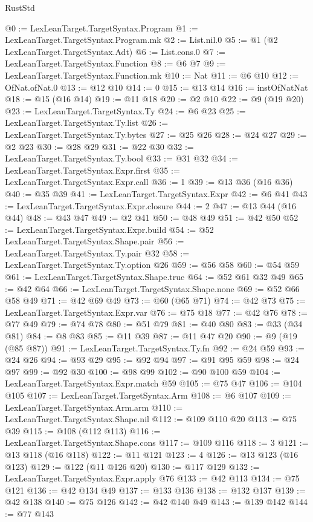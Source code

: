 \begin{lexlean}{RustStd}
\begin{coremodule}
{\begin{coremodule}
{{{{{{{{{@0 := LexLeanTarget.TargetSyntax.Program
@1 := LexLeanTarget.TargetSyntax.Program.mk
@2 := List.nil.{0}
@5 := @1 (@2 LexLeanTarget.TargetSyntax.Adt)
@6 := List.cons.{0}
@7 := LexLeanTarget.TargetSyntax.Function
@8 := @6 @7
@9 := LexLeanTarget.TargetSyntax.Function.mk
@10 := Nat
@11 := @6 @10
@12 := OfNat.ofNat.{0}
@13 := @12 @10
@14 := 0
@15 := @13 @14
@16 := instOfNatNat
@18 := @15 (@16 @14)
@19 := @11 @18
@20 := @2 @10
@22 := @9 (@19 @20)
@23 := LexLeanTarget.TargetSyntax.Ty
@24 := @6 @23
@25 := LexLeanTarget.TargetSyntax.Ty.list
@26 := LexLeanTarget.TargetSyntax.Ty.bytes
@27 := @25 @26
@28 := @24 @27
@29 := @2 @23
@30 := @28 @29
@31 := @22 @30
@32 := LexLeanTarget.TargetSyntax.Ty.bool
@33 := @31 @32
@34 := LexLeanTarget.TargetSyntax.Expr.first
@35 := LexLeanTarget.TargetSyntax.Expr.call
@36 := 1
@39 := @13 @36 (@16 @36)
@40 := @35 @39
@41 := LexLeanTarget.TargetSyntax.Expr
@42 := @6 @41
@43 := LexLeanTarget.TargetSyntax.Expr.closure
@44 := 2
@47 := @13 @44 (@16 @44)
@48 := @43 @47
@49 := @2 @41
@50 := @48 @49
@51 := @42 @50
@52 := LexLeanTarget.TargetSyntax.Expr.build
@54 := @52 LexLeanTarget.TargetSyntax.Shape.pair
@56 := LexLeanTarget.TargetSyntax.Ty.pair @32
@58 := LexLeanTarget.TargetSyntax.Ty.option @26
@59 := @56 @58
@60 := @54 @59
@61 := LexLeanTarget.TargetSyntax.Shape.true
@64 := @52 @61 @32 @49
@65 := @42 @64
@66 := LexLeanTarget.TargetSyntax.Shape.none
@69 := @52 @66 @58 @49
@71 := @42 @69 @49
@73 := @60 (@65 @71)
@74 := @42 @73
@75 := LexLeanTarget.TargetSyntax.Expr.var
@76 := @75 @18
@77 := @42 @76
@78 := @77 @49
@79 := @74 @78
@80 := @51 @79
@81 := @40 @80
@83 := @33 (@34 @81)
@84 := @8 @83
@85 := @11 @39
@87 := @11 @47 @20
@90 := @9 (@19 (@85 @87))
@91 := LexLeanTarget.TargetSyntax.Ty.fn
@92 := @24 @59
@93 := @24 @26
@94 := @93 @29
@95 := @92 @94
@97 := @91 @95 @59
@98 := @24 @97
@99 := @92 @30
@100 := @98 @99
@102 := @90 @100 @59
@104 := LexLeanTarget.TargetSyntax.Expr.match @59
@105 := @75 @47
@106 := @104 @105
@107 := LexLeanTarget.TargetSyntax.Arm
@108 := @6 @107
@109 := LexLeanTarget.TargetSyntax.Arm.arm
@110 := LexLeanTarget.TargetSyntax.Shape.nil
@112 := @109 @110 @20
@113 := @75 @39
@115 := @108 (@112 @113)
@116 := LexLeanTarget.TargetSyntax.Shape.cons
@117 := @109 @116
@118 := 3
@121 := @13 @118 (@16 @118)
@122 := @11 @121
@123 := 4
@126 := @13 @123 (@16 @123)
@129 := @122 (@11 @126 @20)
@130 := @117 @129
@132 := LexLeanTarget.TargetSyntax.Expr.apply @76
@133 := @42 @113
@134 := @75 @121
@136 := @42 @134 @49
@137 := @133 @136
@138 := @132 @137
@139 := @42 @138
@140 := @75 @126
@142 := @42 @140 @49
@143 := @139 @142
@144 := @77 @143
}}}}}}}}}
\end{coremodule}}
\end{coremodule}
\end{lexlean}

